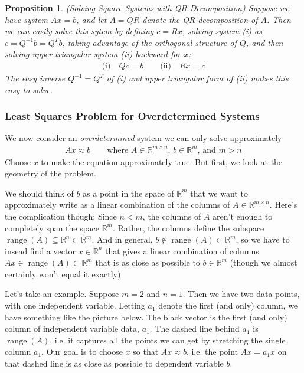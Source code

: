 \documentclass[12pt]{article}
\numberwithin{equation}{section} %
\theoremstyle{plain}
\newtheorem{prop}[thm]{Proposition}
\theoremstyle{definition}
\theoremstyle{remark}
\newcommand{\Rn}{\mathbb{R}^n}
\newcommand{\Rm}{\mathbb{R}^m}
\newcommand{\Rmn}{\mathbb{R}^{m\times n}}
\newcommand{\range}{\operatorname{range}}
\begin{document}
\begin{prop}\emph{(Solving Square Systems with QR Decomposition)}
Suppose we have system $Ax=b$, and let $A=QR$ denote the
QR-decomposition of $A$.
Then we can easily solve this sytem by defining $c=Rx$,
solving system (i) as $c=Q^{-1}b=Q^Tb$, taking advantage of the
orthogonal structure of $Q$, and then solving upper triangular system
(ii) backward for $x$:
\begin{align*}
  \text{(i)}\quad
  Qc = b
  \qquad
  \text{(ii)}\quad
  Rx = c
\end{align*}
The easy inverse $Q^{-1}=Q^T$ of (i) and upper triangular form of (ii)
makes this easy to solve.
\end{prop}


\clearpage
\subsubsection{Least Squares Problem for Overdetermined Systems}

We now consider an \emph{overdetermined} system we can only solve
approximately
\begin{align*}
  Ax\approx b
  \qquad \text{where $A\in\Rmn$, $b\in\Rm$, and $m>n$}
\end{align*}
Choose $x$ to make the equation approximately true. But first, we
look at the geometry of the problem.

We should think of $b$ as a point in the space of $\Rm$ that we want to
approximately write as a linear combination of the columns of
$A\in\Rmn$. Here's the complication though: Since $n<m$, the columns of
$A$ aren't enough to completely span the space $\Rm$. Rather, the
columns define the subspace
$\range(A)\subseteq \Rn \subset \Rm$.
And in general, $b\not\in\range(A)\subset \Rm$, so we have to
insead find a vector $x\in\Rn$ that gives a linear combination of
columns $Ax\in\range(A)\subset\Rm$ that is as close as possible to
$b\in\Rm$ (though we almost certainly won't equal it exactly).

Let's take an example. Suppose $m=2$ and $n=1$. Then we have two
data points, with one independent variable. Letting $a_1$ denote the
first (and only) column, we have something like the picture below.
The black vector is the first (and only) column of independent variable
data, $a_1$. The dashed line behind $a_1$ is
$\range(A)$, i.e. it captures all the points we can get by stretching
the single column $a_1$. Our goal is to choose $x$ so that $Ax\approx
b$, i.e. the point $Ax=a_1x$ on that dashed line is as close as possible
to dependent variable $b$.
\end{document}

